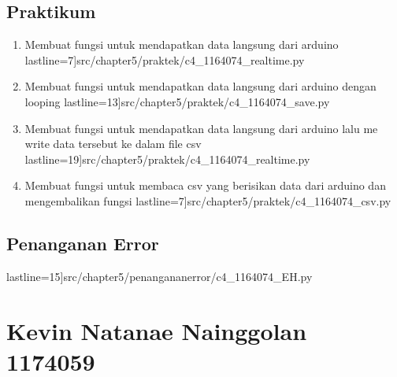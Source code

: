 \subsection{Praktikum}
\begin{enumerate}
\item Membuat fungsi untuk mendapatkan data langsung dari arduino
	 lastline=7]{src/chapter5/praktek/c4_1164074_realtime.py}
\item Membuat fungsi untuk mendapatkan data langsung dari arduino dengan looping
	 lastline=13]{src/chapter5/praktek/c4_1164074_save.py}
\item Membuat fungsi untuk mendapatkan data langsung dari arduino lalu me write data tersebut ke dalam file csv
	 lastline=19]{src/chapter5/praktek/c4_1164074_realtime.py}
\item Membuat fungsi untuk membaca csv yang berisikan data dari arduino dan mengembalikan fungsi
	 lastline=7]{src/chapter5/praktek/c4_1164074_csv.py}
\end{enumerate}

\subsection{Penanganan Error}
 lastline=15]{src/chapter5/penangananerror/c4_1164074_EH.py}

\section {Kevin Natanae Nainggolan 1174059}
